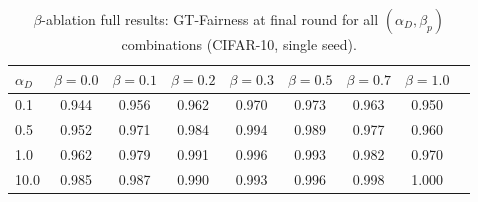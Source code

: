 \documentclass[journal]{IEEEtran}
\theoremstyle{definition}
\theoremstyle{remark}
\begin{document}
\begin{table}[h]
\caption{$\beta$-ablation full results: GT-Fairness at final round
for all $(\alpha_D, \beta_p)$ combinations (CIFAR-10, single seed).}
\label{tab:ablation_full}
\centering
\renewcommand{\arraystretch}{1.05}
\setlength{\tabcolsep}{5pt}
\footnotesize
\begin{tabular}{lcccccccc}
\toprule
$\alpha_D$ & $\beta{=}0.0$ & $\beta{=}0.1$ & $\beta{=}0.2$ &
$\beta{=}0.3$ & $\beta{=}0.5$ & $\beta{=}0.7$ & $\beta{=}1.0$ \\
\midrule
0.1   & 0.944 & 0.956 & 0.962 & 0.970 & 0.973 & 0.963 & 0.950 \\
0.5   & 0.952 & 0.971 & 0.984 & 0.994 & 0.989 & 0.977 & 0.960 \\
1.0   & 0.962 & 0.979 & 0.991 & 0.996 & 0.993 & 0.982 & 0.970 \\
10.0  & 0.985 & 0.987 & 0.990 & 0.993 & 0.996 & 0.998 & 1.000 \\
\bottomrule
\end{tabular}
\end{table}
\end{document}
